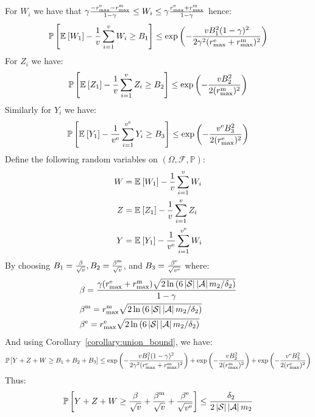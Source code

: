     For $W_i$ we have that $\gamma\frac{-r_{\text{max}}^\text{e} - r_{\text{max}}^\text{m}}{1 - \gamma} \leq W_i \leq \gamma\frac{r_{\text{max}}^\text{e} + r_{\text{max}}^\text{m}}{1 - \gamma}$ hence:
    \begin{equation*}
        \mathbb{P}\left[ {\mathbb{E}_{}\left[ {W_1} \right] - \frac 1v \sum_{i=1}^{v} W_i \geq B_1} \right] \leq \exp{\left(- \frac{vB_1^2(1 - \gamma)^2}{2\gamma^2(r_{\text{max}}^\text{e} + r_{\text{max}}^\text{m})^2}\right)}
    \end{equation*}
    For $Z_i$ we have:
    \begin{equation*}
        \mathbb{P}\left[ {\mathbb{E}_{}\left[ {Z_1} \right] - \frac 1v \sum_{i=1}^{v} Z_i \geq B_2} \right] \leq \exp{\left(- \frac{vB_2^2}{2(r_{\text{max}}^\text{m})^2}\right)}
    \end{equation*}
    Similarly for $Y_i$ we have:
    \begin{equation*}
        \mathbb{P}\left[ {\mathbb{E}_{}\left[ {Y_1} \right] - \frac{1}{v^\text{e}} \sum_{i=1}^{v^\text{e}} Y_i \geq B_3} \right] \leq \exp{\left(- \frac{v^\text{e}B_3^2}{2(r_{\text{max}}^\text{e})^2}\right)}
    \end{equation*}
Define the following random variables on $(\Omega, \mathcal{F}, \mathbb{P})$:
    \begin{align*}
        W &= \mathbb{E}_{}\left[ {W_1} \right] - \frac 1v \sum_{i = 1}^{v} W_i \\
        Z &= \mathbb{E}_{}\left[ {Z_1} \right] - \frac 1v \sum_{i = 1}^{v} Z_i \\
        Y &= \mathbb{E}_{}\left[ {Y_1} \right] - \frac{1}{v^\text{e}} \sum_{i = 1}^{v^\text{e}} W_i
    \end{align*}
By choosing $B_1 = \frac{\beta}{\sqrt v}, B_2 = \frac{\beta^\text{m}}{\sqrt v}$, and $B_3 = \frac{\beta^\text{e}}{\sqrt{v^\text{e}}}$ where:
    \begin{align*}
        &\beta = \frac{\gamma(r_{\text{max}}^\text{e} + r_{\text{max}}^\text{m})\sqrt{2\ln{(6\left \lvert \mathcal{S} \right \rvert\left \lvert \mathcal{A} \right \rvert m_2 / \delta_2)}}}{1 - \gamma} \\
        & \beta^\text{m} = r_{\text{max}}^\text{m}\sqrt{2\ln{(6\left \lvert \mathcal{S} \right \rvert\left \lvert \mathcal{A} \right \rvert m_2/\delta_2)}} \\
         & \beta^\text{e} = r_{\text{max}}^\text{e}\sqrt{2\ln{(6\left \lvert \mathcal{S} \right \rvert\left \lvert \mathcal{A} \right \rvert m_2/\delta_2)}}
\end{align*}
%
And using Corollary~\ref{corollary:union_bound}, we have:
%
\begin{equation*}
        \mathbb{P}\left[ {Y + Z + W \geq B_1 + B_2 + B_3} \right] \leq \exp{\left(- \frac{vB_1^2(1 - \gamma)^2}{2\gamma^2(r_{\text{max}}^\text{e} + r_{\text{max}}^\text{m})^2}\right)} + \exp{\left(- \frac{vB_2^2}{2(r_{\text{max}}^\text{m})^2}\right)} + \exp{\left(- \frac{v^\text{e}B_3^2}{2(r_{\text{max}}^\text{e})^2}\right)}
\end{equation*}
%
Thus:
%
\begin{equation}
        \label{eq:y_z_w}
        \mathbb{P}\left[ {Y + Z + W \geq \frac{\beta}{\sqrt v} + \frac{\beta^\text{m}}{\sqrt v} + \frac{\beta^\text{e}}{\sqrt{v^\text{e}}}} \right] \leq \frac{\delta_2}{2\left \lvert \mathcal{S} \right \rvert\left \lvert \mathcal{A} \right \rvert m_2}
\end{equation}
